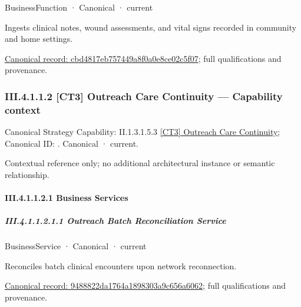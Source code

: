 \label{element:cbd4817eb757449a8f0a0e8ce02c5f07}
{\small BusinessFunction · Canonical · current}\par

Ingests clinical notes, wound assessments, and vital signs recorded in community and home settings.


{\footnotesize \href{../../../../continuum/business/business-function/cbd4817eb757449a8f0a0e8ce02c5f07.md}{Canonical record: cbd4817eb757449a8f0a0e8ce02c5f07}; full qualifications and provenance.}\par
\subsubsection*{III.4.1.1.2 [CT3] Outreach Care Continuity — Capability context}
\label{navigation:III.4.1.1.2}

{\small Canonical Strategy Capability: II.1.3.1.5.3 \hyperref[element:8526d971b07f40de84ef05b0d192089c]{[CT3] Outreach Care Continuity}; Canonical ID: \texttt{}. Canonical · current.}\par
Contextual reference only; no additional architectural instance or semantic relationship.\par
\paragraph*{III.4.1.1.2.1 Business Services}
\label{navigation:III.4.1.1.2.1}

\subparagraph*{III.4.1.1.2.1.1 Outreach Batch Reconciliation Service}
\label{navigation:III.4.1.1.2.1.1}

\label{element:9488822da1764a1898303a9c656a6062}
{\small BusinessService · Canonical · current}\par

Reconciles batch clinical encounters upon network reconnection.


{\footnotesize \href{../../../../continuum/business/business-service/9488822da1764a1898303a9c656a6062.md}{Canonical record: 9488822da1764a1898303a9c656a6062}; full qualifications and provenance.}\par
